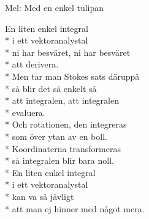 \begin{SongText}[Integralvisan]
    \begin{SongInfo}
        Mel: Med en enkel tulipan
    \end{SongInfo}
    \begin{SongVerse}
        En liten enkel integral\\*%
        i ett vektoranalystal\\*%
        ni har besväret, ni har besväret\\*%
        att derivera.\\*%
        Men tar man Stokes sats däruppå\\*%
        så blir det så enkelt så\\*%
        att integralen, att integralen\\*%
        evaluera.\\*%
        Och rotationen, den integreras\\*%
        som över ytan av en boll.\\*%
        Koordinaterna transformeras\\*%
        så integralen blir bara noll.\\*%
        En liten enkel integral\\*%
        i ett vektoranalystal\\*%
        kan va så jävligt\\*%
        att man ej hinner med något mera.
    \end{SongVerse}
\end{SongText}
